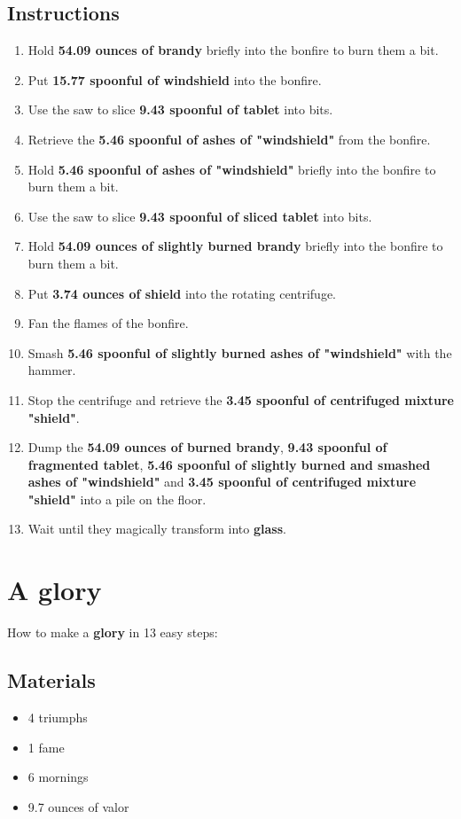 \documentclass{article}
\begin{document}
\subsection{Instructions}\begin{enumerate}
\item 
Hold \textbf{54.09 ounces of brandy} briefly into the bonfire to burn them a bit.
\item 
Put \textbf{15.77 spoonful of windshield} into the bonfire.
\item 
Use the saw to slice \textbf{9.43 spoonful of tablet} into bits.
\item 
Retrieve the \textbf{5.46 spoonful of ashes of "windshield"} from the bonfire.
\item 
Hold \textbf{5.46 spoonful of ashes of "windshield"} briefly into the bonfire to burn them a bit.
\item 
Use the saw to slice \textbf{9.43 spoonful of sliced tablet} into bits.
\item 
Hold \textbf{54.09 ounces of slightly burned brandy} briefly into the bonfire to burn them a bit.
\item 
Put \textbf{3.74 ounces of shield} into the rotating centrifuge.
\item 
Fan the flames of the bonfire.
\item 
Smash \textbf{5.46 spoonful of slightly burned ashes of "windshield"} with the hammer.
\item 
Stop the centrifuge and retrieve the \textbf{3.45 spoonful of centrifuged mixture "shield"}.
\item 
Dump the \textbf{54.09 ounces of burned brandy}, \textbf{9.43 spoonful of fragmented tablet}, \textbf{5.46 spoonful of slightly burned and smashed ashes of "windshield"} and \textbf{3.45 spoonful of centrifuged mixture "shield"} into a pile on the floor.
\item 
Wait until they magically transform into \textbf{glass}.
\end{enumerate}
\newpage
\section{A glory}How to make a \textbf{glory} in 13 easy steps:

\subsection{Materials}\begin{itemize}
\item 
4 triumphs
\item 
1 fame
\item 
6 mornings
\item 
9.7 ounces of valor
\end{itemize}
\end{document}
